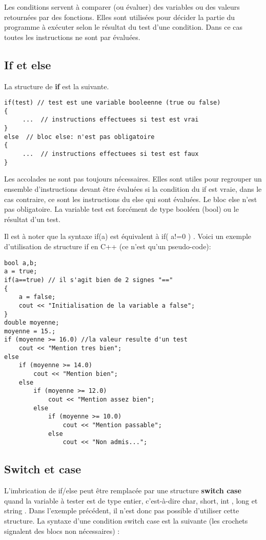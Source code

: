 \documentclass[a4paper, oneside,11pt]{book}
\begin{document}
Les conditions servent \`a comparer (ou \'evaluer) des variables ou des valeurs retourn\'ees par des fonctions. Elles sont utilis\'ees pour d\'ecider la partie du programme \`a  ex\'ecuter
selon le r\'esultat du test d'une condition. Dans ce cas toutes les instructions ne sont par \'evalu\'ees.

\subsection{If et else}

La structure de \textbf{if} est la suivante.

\begin{lstlisting}
if(test) // test est une variable booleenne (true ou false)
{
     ...  // instructions effectuees si test est vrai
}
else  // bloc else: n'est pas obligatoire
{
     ...  // instructions effectuees si test est faux
}
\end{lstlisting}

Les accolades ne sont pas toujours n\'ecessaires. Elles sont utiles pour regrouper un ensemble d'instructions devant \^etre \'evalu\'ees si la condition du if est vraie, dans le cas
contraire, ce sont les instructions du else qui sont \'evalu\'ees. Le bloc else n'est pas obligatoire. La variable test est forc\'ement de type bool\'een (bool) ou 
le r\'esultat d'un test.   

Il est \`a noter que la syntaxe if(a) est \'equivalent \`a if( a!=0 ) . Voici un exemple d'utilisation de structure if en C++ (ce n'est qu'un pseudo-code):

\begin{lstlisting}
bool a,b;
a = true;
if(a==true) // il s'agit bien de 2 signes "=="
{
    a = false;
    cout << "Initialisation de la variable a false";
}
double moyenne;
moyenne = 15.;
if (moyenne >= 16.0) //la valeur resulte d'un test
    cout << "Mention tres bien";
else
    if (moyenne >= 14.0)
        cout << "Mention bien";
    else
        if (moyenne >= 12.0)
            cout << "Mention assez bien";
        else
            if (moyenne >= 10.0)
                cout << "Mention passable";
            else
                cout << "Non admis...";
\end{lstlisting}


\subsection{Switch et case}

L'imbrication de if/else peut \^etre remplac\'ee par une structure \textbf{switch case} quand la variable \`a
tester est de type entier, c'est-\`a-dire char, short, int , long et string . Dans l'exemple pr\'ec\'edent,
il n'est donc pas possible d'utiliser cette structure.
La syntaxe d'une condition switch case est la suivante (les crochets signalent des blocs non
n\'ecessaires) :
\end{document}

